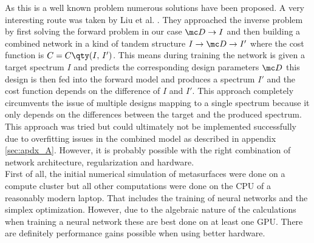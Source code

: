 \indent As this is a well known problem numerous solutions have been proposed. A very interesting route was taken by Liu et al. \cite{Liu2018}. They approached the inverse problem by first solving the forward problem in our case $\mc D \rightarrow I$ and then building a combined network in a kind of tandem structure 
$I \rightarrow \mc D \rightarrow I'$
where the cost function is 
$C = C \qty(I, \, I')$.
This means during training the network is given a target spectrum $I$ and predicts the corresponding design parameters $\mc D$ this design is then fed into the forward model and produces a spectrum $I'$ and the cost function depends on the difference of $I$ and $I'$. This approach completely circumvents the issue of multiple designs mapping to a single spectrum because it only depends on the differences between the target and the produced spectrum. This approach was tried but could ultimately not be implemented successfully due to overfitting issues in the combined model as described in appendix \ref{sec:apdx_A}. However, it is probably possible with the right combination of network architecture, regularization and hardware.
\\    



First of all, the initial numerical simulation of metasurfaces were done on a compute cluster but all other computations were done on the CPU of a reasonably modern laptop. That includes the training of neural networks and the simplex optimization. However, due to the algebraic nature of the calculations when training a neural network these are best done on at least one GPU. There are definitely performance gains possible when using better hardware.
\\

\indent

